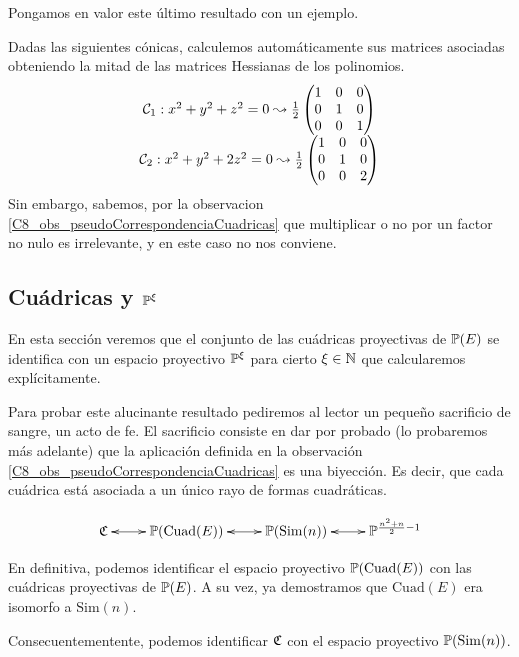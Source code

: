 Pongamos en valor este último resultado con un ejemplo.
\begin{exa}
	Dadas las siguientes cónicas, calculemos automáticamente sus matrices asociadas obteniendo la mitad de las matrices Hessianas de los polinomios.
	\[\begin{array}{c}
	\mathcal{C}_1:x^2+y^2+z^2=0\leadsto\frac{1}{2}\begin{pmatrix}
	1 & 0 & 0\\
	0 & 1 & 0\\
	0 & 0 & 1
	\end{pmatrix}\\
	\mathcal{C}_2:x^2+y^2+2z^2=0\leadsto\frac{1}{2}\begin{pmatrix}
	1 & 0 & 0\\
	0 & 1 & 0\\
	0 & 0 & 2
	\end{pmatrix}
	\end{array}\]
	Sin embargo, sabemos, por la observacion \ref{C8_obs_pseudoCorrespondenciaCuadricas} que multiplicar o no por un factor no nulo es irrelevante, y en este caso no nos conviene.
\end{exa}
\subsection{Cuádricas y $\mathbb{P}^\xi$}
En esta sección veremos que el conjunto de las cuádricas proyectivas de $\mathbb{P}(E)$ se identifica con un espacio proyectivo $\mathbb{P}^\xi$ para cierto $\xi\in\mathbb{N}$ que calcularemos explícitamente.

Para probar este alucinante resultado pediremos al lector un pequeño sacrificio de sangre, un acto de fe. El sacrificio consiste en dar por probado (lo probaremos más adelante) que la aplicación definida en la observación \ref{C8_obs_pseudoCorrespondenciaCuadricas} es una biyección. Es decir, que cada cuádrica está asociada a un único rayo de formas cuadráticas.

\[
\xymatrix
{
	\mf{C} \ar@{<->}[r]& \proy(\mathrm{Cuad}(E)) \ar@{<->}[r]& \proy(\mathrm{Sim}(n)) \ar@{<->}[r]& \proy^{\frac{n^2+n}{2}-1}
}
\]

En definitiva, podemos identificar el espacio proyectivo $\mathbb{P}(\mathrm{Cuad}(E))$ con las cuádricas proyectivas de $\mathbb{P}(E)$. A su vez, ya demostramos que $\mathrm{Cuad}(E)$ era isomorfo a $\mathrm{Sim}(n)$.

Consecuentementente, podemos identificar $\mathfrak{C}$ con el espacio proyectivo $\mathbb{P}(\mathrm{Sim}(n))$.

